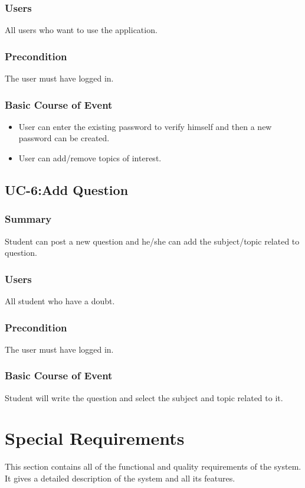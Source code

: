\documentclass[12pt]{article}
\begin{document}
\subsubsection{Users}
All users who want to use the application.
\subsubsection{Precondition}
The user must have logged in.
\subsubsection{Basic Course of Event}
\begin{itemize}
\item User can enter the existing password to verify himself and then a new password can be created.
\item User can add/remove topics of interest.
\end{itemize}

\subsection{UC-6:Add Question}
\subsubsection{Summary}
Student can post a new question and he/she can add the subject/topic related to question.
\subsubsection{Users}
All student who have a doubt.
\subsubsection{Precondition}
The user must have logged in.
\subsubsection{Basic Course of Event}
Student will write the question and select the subject and topic related to it.

\section{Special Requirements}
This section contains all of the functional and quality requirements of the system. It gives a detailed description of the system and all its features.
\end{document}
